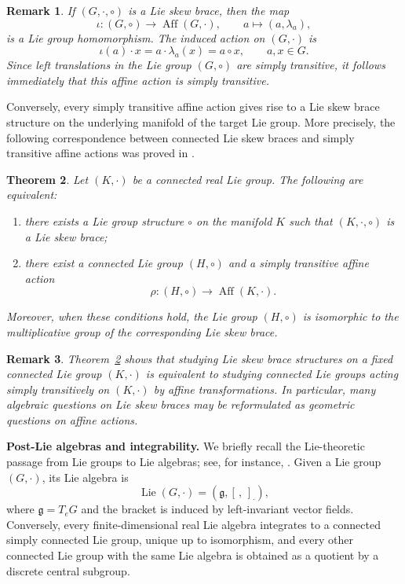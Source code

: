\documentclass[reqno]{amsart}
\newtheorem{theorem}{Theorem}[section]
\newtheorem{remark}[theorem]{Remark}
\newcommand{\g}{\mathfrak{g}}
\DeclareMathOperator{\Lie}{Lie}
\DeclareMathOperator{\Aff}{Aff}
\begin{document}
\begin{remark}\rm
If $(G,\cdot,\circ)$ is a Lie skew brace, then the map
\[
\iota:(G,\circ)\longrightarrow \Aff(G,\cdot),
\qquad
a\longmapsto (a,\lambda_a),
\]
is a Lie group homomorphism. The induced action on $(G,\cdot)$ is
\[
\iota(a)\cdot x
=
a\cdot \lambda_a(x)
=
a\circ x,
\qquad a,x\in G.
\]
Since left translations in the Lie group $(G,\circ)$ are simply transitive, it
follows immediately that this affine action is simply transitive.
\end{remark}

Conversely, every simply transitive affine action gives rise to a Lie skew
brace structure on the underlying manifold of the target Lie group. More
precisely, the following correspondence between connected Lie skew braces and
simply transitive affine actions was proved in
\cite[Thm.~2.13]{DameleLoi2026}.

\begin{theorem}\label{thm:LSB-affine-correspondence}
Let $(K,\cdot)$ be a connected real Lie group. The following are equivalent:
\begin{enumerate}[label=\textup{(\roman*)}]
    \item there exists a Lie group structure $\circ$ on the manifold $K$ such
    that $(K,\cdot,\circ)$ is a Lie skew brace;

    \item there exist a connected Lie group $(H,\circ)$ and a simply transitive
    affine action
    \[
    \rho:(H,\circ)\longrightarrow \Aff(K,\cdot).
    \]
\end{enumerate}
Moreover, when these conditions hold, the Lie group $(H,\circ)$ is isomorphic
to the multiplicative group of the corresponding Lie skew brace.
\end{theorem}

\begin{remark}\rm
Theorem~\ref{thm:LSB-affine-correspondence} shows that studying Lie skew brace
structures on a fixed connected Lie group $(K,\cdot)$ is equivalent to studying
connected Lie groups acting simply transitively on $(K,\cdot)$ by affine
transformations. In particular, many algebraic questions on Lie skew braces may
be reformulated as geometric questions on affine actions.
\end{remark}

\medskip
\noindent
\textbf{Post-Lie algebras and integrability.}
We briefly recall the Lie-theoretic passage from Lie groups to Lie algebras;
see, for instance, \cite{Hall2015,Warner}. Given a Lie group $(G,\cdot)$, its
Lie algebra is
\[
\Lie(G,\cdot)=(\g,[\, ,\,]_{\cdot}),
\]
where $\g=T_eG$ and the bracket is induced by left-invariant vector fields.
Conversely, every finite-dimensional real Lie algebra integrates to a connected
simply connected Lie group, unique up to isomorphism, and every other connected
Lie group with the same Lie algebra is obtained as a quotient by a discrete
central subgroup.
\end{document}
